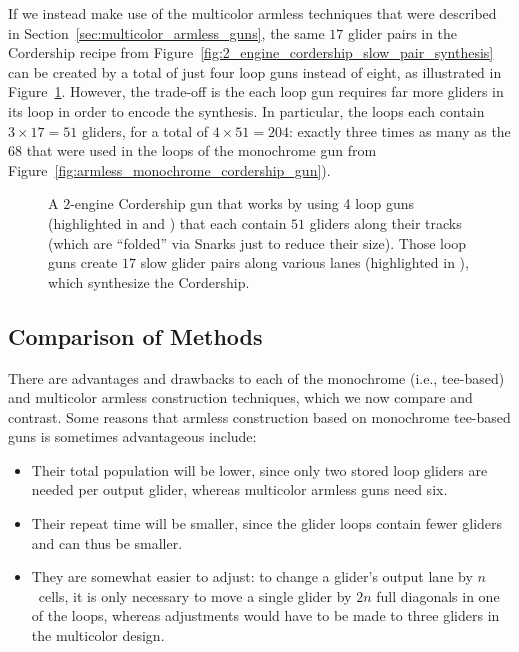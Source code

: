 If we instead make use of the multicolor armless techniques that were described in Section~\ref{sec:multicolor_armless_guns}, the same $17$ glider pairs in the Cordership recipe from Figure~\ref{fig:2_engine_cordership_slow_pair_synthesis} can be created by a total of just four loop guns instead of eight, as illustrated in Figure~\ref{fig:armless_cordership_gun}. However, the trade-off is the each loop gun requires far more gliders in its loop in order to encode the synthesis. In particular, the loops each contain $3 \times 17 = 51$ gliders, for a total of $4 \times 51 = 204$: exactly three times as many as the $68$ that were used in the loops of the monochrome gun from Figure~\ref{fig:armless_monochrome_cordership_gun}).

\clearpage %

\begin{figure}[!htb]
	\centering
	\caption{A $2$-engine Cordership gun that works by using 4 loop guns (highlighted in  and ) that each contain $51$ gliders along their tracks (which are ``folded'' via Snarks just to reduce their size). Those loop guns create $17$ slow glider pairs along various lanes (highlighted in ), which synthesize the Cordership.}\label{fig:armless_cordership_gun}
\end{figure}


\subsection{Comparison of Methods}\label{sec:method_compare}

There are advantages and drawbacks to each of the monochrome (i.e., tee-based) and multicolor armless construction techniques, which we now compare and contrast. Some reasons that armless construction based on monochrome tee-based guns is sometimes advantageous include:\smallskip

\begin{itemize}
	\item Their total population will be lower, since only two stored loop gliders are needed per output glider, whereas multicolor armless guns need six.\smallskip
	
	\item Their repeat time will be smaller, since the glider loops contain fewer gliders and can thus be smaller.\smallskip
	
	\item They are somewhat easier to adjust: to change a glider's output lane by $n$~cells, it is only necessary to move a single glider by $2n$ full diagonals in one of the loops, whereas adjustments would have to be made to three gliders in the multicolor design.\smallskip
\end{itemize}

